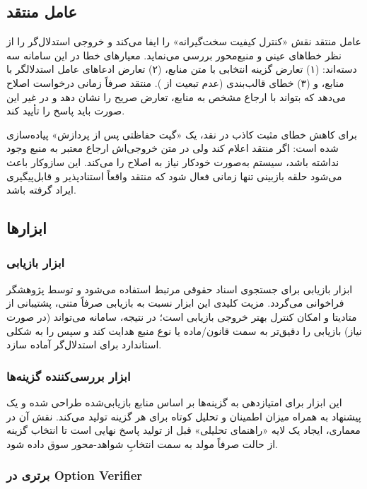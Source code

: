 \documentclass[12pt,a4paper]{report}
\begin{document}
	\subsection*{عامل منتقد}
	
	عامل منتقد نقش «کنترل کیفیت سخت‌گیرانه» را ایفا می‌کند و خروجی استدلال‌گر را از نظر خطاهای عینی و منبع‌محور بررسی می‌نماید. معیارهای خطا در این سامانه سه دسته‌اند: (۱) تعارض گزینه انتخابی با متن منابع، (۲) تعارض ادعاهای عامل استدلالگر با منابع، و (۳) خطای قالب‌بندی (عدم تبعیت از ). منتقد صرفاً زمانی درخواست اصلاح می‌دهد که بتواند با ارجاع مشخص به منابع، تعارض صریح را نشان دهد و در غیر این صورت باید پاسخ را تأیید کند.
	
	برای کاهش خطای مثبت کاذب  در نقد، یک «گیت حفاظتی پس از پردازش» پیاده‌سازی شده است: اگر منتقد  اعلام کند ولی در متن خروجی‌اش ارجاع معتبر به منبع وجود نداشته باشد، سیستم به‌صورت خودکار نیاز به اصلاح را  می‌کند. این سازوکار باعث می‌شود حلقه بازبینی تنها زمانی فعال شود که منتقد واقعاً استنادپذیر و قابل‌پیگیری ایراد گرفته باشد.
	
	\subsection{ابزارها}
	
	\subsubsection*{ابزار بازیابی}
	
	ابزار بازیابی برای جستجوی اسناد حقوقی مرتبط استفاده می‌شود و توسط پژوهشگر فراخوانی می‌گردد. مزیت کلیدی این ابزار نسبت به بازیابی صرفاً متنی، پشتیبانی از متادیتا و امکان کنترل بهتر خروجی بازیابی است؛ در نتیجه، سامانه می‌تواند (در صورت نیاز) بازیابی را دقیق‌تر به سمت قانون/ماده یا نوع منبع هدایت کند و سپس  را به شکلی استاندارد برای استدلال‌گر آماده سازد.
	
	\subsubsection*{ابزار بررسی‌کننده گزینه‌ها}
	
	این ابزار برای امتیازدهی به گزینه‌ها بر اساس منابع بازیابی‌شده طراحی شده و یک پیشنهاد به همراه میزان اطمینان و تحلیل کوتاه برای هر گزینه تولید می‌کند. نقش آن در معماری، ایجاد یک لایه «راهنمای تحلیلی» قبل از تولید پاسخ نهایی است تا انتخاب گزینه از حالت صرفاً مولد به سمت انتخابِ شواهد-محور سوق داده شود.
	
	\subsubsection*{برتری  در Option Verifier}
	
\end{document}
